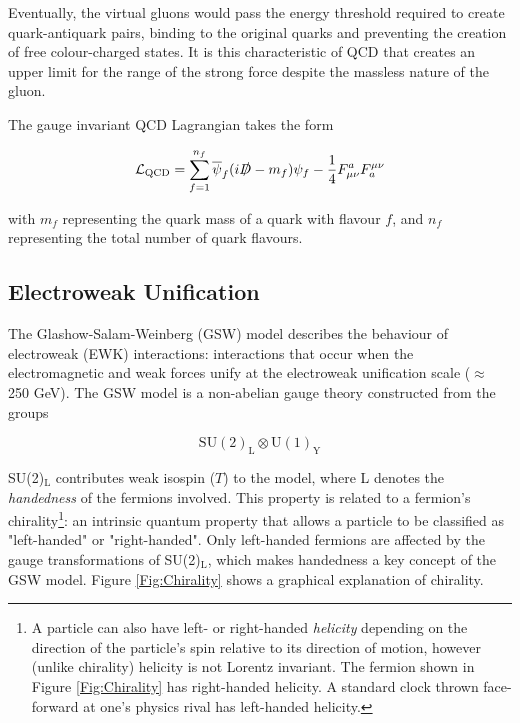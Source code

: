 \documentclass[12pt,a4paper,epsf,portrait,times,epsfig]{report}
\begin{document}
	Eventually, the virtual gluons would pass the energy threshold required to create quark-antiquark pairs, binding to the original quarks and preventing the creation of free colour-charged states. It is this characteristic of QCD that creates an upper limit for the range of the strong force despite the massless nature of the gluon. 

	The gauge invariant QCD Lagrangian takes the form

	\begin{equation}
		\mathcal{L}_{\mathrm{QCD}} = \sum_{f = 1}^{n_{f}}\overline{\psi}_{f}(i\slashed{D}-m_{f})\psi_{f}-\frac{1}{4}F_{\mu\nu}^{a}F_{a}^{\mu\nu}  
	\end{equation}

	with $m_{f}$ representing the quark mass of a quark with flavour $f$, and $n_{f}$ representing the total number of quark flavours. 

	\subsection{Electroweak Unification}

	The Glashow-Salam-Weinberg (GSW) model describes the behaviour of electroweak (EWK) interactions: interactions that occur when the electromagnetic and weak forces unify at the electroweak unification scale ($\approx$ 250 GeV). The GSW model is a non-abelian gauge theory constructed from the groups 
	
	\begin{equation}
		\mathrm{SU(2)}_{\mathrm{L}} \otimes \mathrm{U(1)}_{\mathrm{Y}}
	\end{equation}

	SU(2)$_{\mathrm{L}}$ contributes weak isospin ($T$) to the model, where L denotes the \textit{handedness} of the fermions involved. This property is related to a fermion's chirality\footnote{A particle can also have left- or right-handed \textit{helicity} depending on the direction of the particle's spin relative to its direction of motion, however (unlike chirality) helicity is not Lorentz invariant. The fermion shown in Figure \ref{Fig:Chirality} has right-handed helicity. A standard clock thrown face-forward at one's physics rival has left-handed helicity.}: an intrinsic quantum property that allows a particle to be classified as "left-handed" or "right-handed". Only left-handed fermions are affected by the gauge transformations of SU(2)$_{\mathrm{L}}$, which makes handedness a key concept of the GSW model. Figure \ref{Fig:Chirality} shows a graphical explanation of chirality. \par
\end{document}
